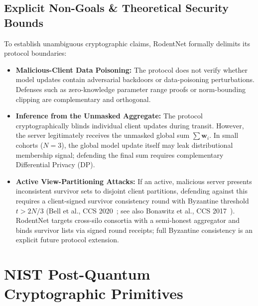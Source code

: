 \documentclass[11pt,a4paper]{report}
\begin{document}
\subsection*{Explicit Non-Goals \& Theoretical Security Bounds}
To establish unambiguous cryptographic claims, RodentNet formally delimits its protocol boundaries:
\begin{itemize}[itemsep=2pt]
  \item \textbf{Malicious-Client Data Poisoning:} The protocol does not verify whether model updates contain adversarial backdoors or data-poisoning perturbations. Defenses such as zero-knowledge parameter range proofs or norm-bounding clipping are complementary and orthogonal.
  \item \textbf{Inference from the Unmasked Aggregate:} The protocol cryptographically blinds individual client updates during transit. However, the server legitimately receives the unmasked global sum $\sum \mathbf{w}_i$. In small cohorts ($N=3$), the global model update itself may leak distributional membership signal; defending the final sum requires complementary Differential Privacy (DP).
  \item \textbf{Active View-Partitioning Attacks:} If an active, malicious server presents inconsistent survivor sets to disjoint client partitions, defending against this requires a client-signed survivor consistency round with Byzantine threshold $t > 2N/3$ (Bell et al., CCS 2020~\cite{bell2020}; see also Bonawitz et al., CCS 2017~\cite{bonawitz2017}). RodentNet targets cross-silo consortia with a semi-honest aggregator and binds survivor lists via signed round receipts; full Byzantine consistency is an explicit future protocol extension.
\end{itemize}

\section{NIST Post-Quantum Cryptographic Primitives}
\end{document}
